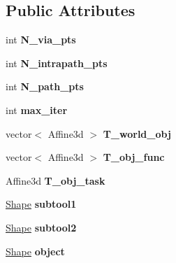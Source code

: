 \subsection*{Public Attributes}
\begin{DoxyCompactItemize}
\item 
\mbox{\label{classMCT__Search_a054354b0c101f6c8ab122781f5bf965f}} 
int {\bfseries N\+\_\+via\+\_\+pts}
\item 
\mbox{\label{classMCT__Search_af841697d9d2cfb2fe9f82b1f6254c7b9}} 
int {\bfseries N\+\_\+intrapath\+\_\+pts}
\item 
\mbox{\label{classMCT__Search_a86a1f14b3fe6dd32ac77fa328e1b0713}} 
int {\bfseries N\+\_\+path\+\_\+pts}
\item 
\mbox{\label{classMCT__Search_adda65004d78d9716fe508db26eb4580d}} 
int {\bfseries max\+\_\+iter}
\item 
\mbox{\label{classMCT__Search_a1b51bdf4a8a7a606bd4ee7a40bc9bc37}} 
vector$<$ Affine3d $>$ {\bfseries T\+\_\+world\+\_\+obj}
\item 
\mbox{\label{classMCT__Search_ac67fcdc0e82da528f730f235a29388d4}} 
vector$<$ Affine3d $>$ {\bfseries T\+\_\+obj\+\_\+func}
\item 
\mbox{\label{classMCT__Search_a0cde1b8c3137cba8d20c01d3495ce934}} 
Affine3d {\bfseries T\+\_\+obj\+\_\+task}
\item 
\mbox{\label{classMCT__Search_ac01ec3e30dedbb73cb161d16595858c8}} 
\hyperlink{structShape}{Shape} {\bfseries subtool1}
\item 
\mbox{\label{classMCT__Search_a556d98ae62d0a72d1b7297ddbdc909ca}} 
\hyperlink{structShape}{Shape} {\bfseries subtool2}
\item 
\mbox{\label{classMCT__Search_acc3c7f8c1fd8268af823ac3e3d775820}} 
\hyperlink{structShape}{Shape} {\bfseries object}
\item 
\mbox{\label{classMCT__Search_a4064b83c8a8af24917ac7c416414c954}} 

\end{DoxyCompactItemize}
